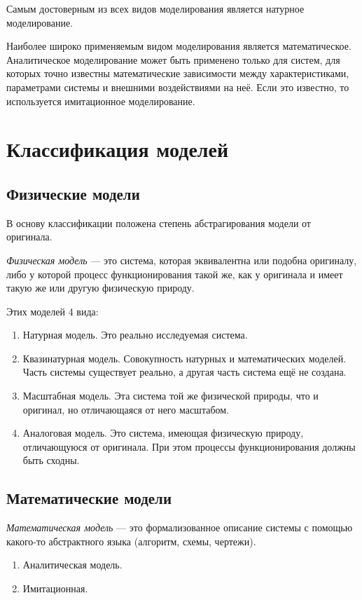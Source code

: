 \documentclass[12pt, russian, oneside, article]{ncc}
\begin{document}
Самым достоверным из всех видов моделирования является натурное моделирование.

Наиболее широко применяемым видом моделирования является математическое. Аналитическое моделирование может быть применено только для систем, для которых точно известны математические зависимости между характеристиками, параметрами системы и внешними воздействиями на неё. Если это известно, то используется имитационное моделирование.
\section{Классификация моделей}
\label{sec-3}
\subsection{Физические модели}
\label{sec-3_1}


В основу классификации положена степень абстрагирования модели от оригинала.

\emph{Физическая модель} --- это система, которая эквивалентна или подобна оригиналу, либо у которой процесс функционирования такой же, как у оригинала и имеет такую же или другую физическую природу.

Этих моделей 4 вида:
\begin{enumerate}
\item Натурная модель. Это реально исследуемая система.
\item Квазинатурная модель. Совокупность натурных и математических моделей. Часть системы существует реально, а другая часть система ещё не создана.
\item Масштабная модель. Эта система той же физической природы, что и оригинал, но отличающаяся от него масштабом.
\item Аналоговая модель. Это система, имеющая физическую природу, отличающуюся от оригинала. При этом процессы функционирования должны быть сходны.
\end{enumerate}
\subsection{Математические модели}
\label{sec-3_2}


\emph{Математическая модель} --- это формализованное описание системы с помощью какого-то абстрактного языка (алгоритм, схемы, чертежи).

\begin{enumerate}
\item Аналитическая модель.
\item Имитационная.
\end{enumerate}
\end{document}
